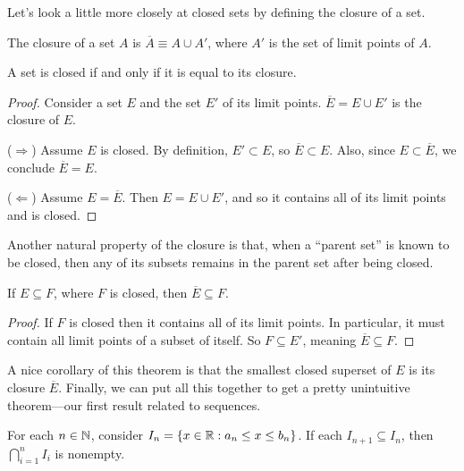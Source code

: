 \documentclass[../m131main.tex]{subfiles}
\begin{document}
Let's look a little more closely at closed sets by defining the closure of a set.

\begin{definition}[Closure]
    The closure of a set $A$ is $\overline{A} \equiv A \cup A'$, where $A'$ is the set of limit points of $A$.
\end{definition}

\begin{theorem}[]
    A set is closed if and only if it is equal to its closure.
\end{theorem}

\begin{proof}
    Consider a set $E$ and the set $E'$ of its limit points.
    $\overline{E} = E \cup E'$ is the closure of $E$.

    ($\Rightarrow$)
    Assume $E$ is closed.
    By definition, $E' \subset E$, so $\overline{E} \subset E$.
    Also, since $E \subset \overline{E}$, we conclude $\overline{E} = E$.
    \smallskip

    ($\Leftarrow$)
    Assume $E = \overline{E}$.
    Then $E = E \cup E'$, and so it contains all of its limit points and is closed.
\end{proof}

Another natural property of the closure is that, when a ``parent set'' is known to be closed, then any of its subsets remains in the parent set after being closed.

\begin{theorem}[]
    If $E \subseteq F$, where $F$ is closed, then $\overline{E} \subseteq F$.
\end{theorem}

\begin{proof}
    If $F$ is closed then it contains all of its limit points.
    In particular, it must contain all limit points of a subset of itself.
    So $F \subseteq E'$, meaning $\overline{E} \subseteq F$.
\end{proof}

A nice corollary of this theorem is that the smallest closed superset of $E$ is its closure $\overline{E}$.
Finally, we can put all this together to get a pretty unintuitive theorem---our first result related to sequences.

\begin{theorem}
    For each $n \in \mathbb{N}$, consider $I_n = \left\{ x \in \mathbb{R} : a_n \leq x \leq b_n \right\}$.
    If each $I_{n+1} \subseteq I_n$, then $\bigcap_{i=1}^n I_i$ is nonempty.
\end{theorem}
\end{document}
